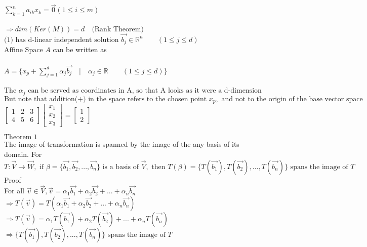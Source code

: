 \documentclass[10pt]{article}
\begin{document}
$\sum_{k=1}^{n} a_{i k} x_{k} = \vec{0} (1 \leq i \leq m)$\\\\
$\Rightarrow dim(Ker(M)) = d \quad \text{(Rank Theorem)}$\\
$\text{(1) has d-linear independent solution } \vec{b_{j}} \in \mathbb{R}^{n} \quad\quad (1 \leq j \leq d)$\\
$\text{Affine Space }\mathit{A}$ can be written as\\\\ 
$A = \Big\{ x_{p} + \sum_{j=1}^{d}\alpha_{j}\vec{b_{j}} \quad \vert \quad \alpha_{j} \in \mathbb{R} \quad\quad (1 \leq j \leq d)\Big\} $\\\\
$\text{The } \alpha_{j} \text{ can be served as coordinates in A, so that A looks as it were a d-dimension coordiate space.}$\\ 
$\text{But note that addition(+) in the space refers to the chosen point } x_{p}, \text{ and not to the origin of the base vector space}$\\

$
        \begin{bmatrix}
        1 & 2 & 3 \\
        4 & 5 & 6    
        \end{bmatrix}
        \left[
        \begin{array}{c}
        x_1 \\
        x_2 \\
        x_3 
        \end{array}
        \right] = 
        \left[ 
        \begin{array}{c}
        1 \\ 
        2 
        \end{array}
        \right]
$
\newpage

$\text{Theorem 1}$\\

The image of transformation is spanned by the image of the any basis of its domain. For $T:\vec{V} \rightarrow \vec{W}, \text{ if } \beta=\{ \vec{b_1},\vec{b_2},...,\vec{b_n} \} \text{ is a basis of }\vec{V}, 
\text{ then }T(\beta) = \{ T(\vec{b_1}), T(\vec{b_2}), ... ,T(\vec{b_n})\} \text{ spans the image of }T$\\

Proof\\
For all $\vec{v} \in \vec{V}, \vec{v} = \alpha_1\vec{b_1} + \alpha_2\vec{b_2} + ... + \alpha_n\vec{b_n}$\\
$\Rightarrow T(\vec{v}) = T(\alpha_1\vec{b_1} + \alpha_2\vec{b_2} + ... + \alpha_n\vec{b_n})$\\
$\Rightarrow T(\vec{v}) = \alpha_1 T(\vec{b_1}) + \alpha_2 T(\vec{b_2}) + ... + \alpha_n T(\vec{b_n})$\\
$\Rightarrow \{ T(\vec{b_1}), T(\vec{b_2}),...,T(\vec{b_n})\} \text{ spans the image of }T$\\
\end{document}
